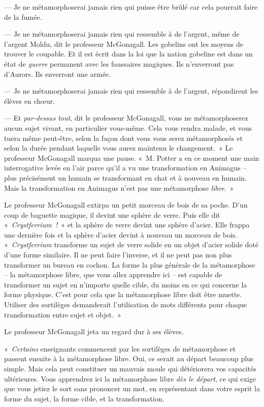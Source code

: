 --- Je ne métamorphoserai jamais rien qui puisse être brûlé car cela pourrait faire de la fumée.

--- Je ne métamorphoserai jamais rien qui ressemble à de l'argent, même de l'argent Moldu, dit le professeur McGonagall. Les gobelins ont les moyens de trouver le coupable. Et il est écrit dans la loi que la nation gobeline est dans un état de \emph{guerre} permanent avec les faussaires magiques. Ils n'enverront pas d'Aurors. Ils enverront une armée.

--- Je ne métamorphoserai jamais rien qui ressemble à de l'argent, répondirent les élèves en chœur.

--- Et \emph{par-dessus tout}, dit le professeur McGonagall, vous ne métamorphoserez aucun sujet vivant, en particulier vous-même. Cela vous rendra malade, et vous tuera même peut-être, selon la façon dont vous vous serez métamorphosés et selon la durée pendant laquelle vous aurez maintenu le changement.~» Le professeur McGonagall marqua une pause. «~M. Potter a en ce moment une main interrogative levée en l'air parce qu'il a vu une transformation en Animagus -- plus précisément un humain se transformant en chat et à nouveau en humain. Mais la transformation en Animagus n'est pas une métamorphose \emph{libre}.~»

Le professeur McGonagall extirpa un petit morceau de bois de sa poche. D'un coup de baguette magique, il devint une sphère de verre. Puis elle dit «~\emph{Crystferrium~!}~» et la sphère de verre devint une sphère d'acier. Elle frappa une dernière fois et la sphère d'acier devint à nouveau un morceau de bois. «~\emph{Crystferrium} transforme un sujet de verre solide en un objet d'acier solide doté d'une forme similaire. Il ne peut faire l'inverse, et il ne peut pas non plus transformer un bureau en cochon. La forme la plus générale de la métamorphose -- la métamorphose libre, que vous allez apprendre ici -- est capable de transformer un sujet en n'importe quelle cible, du moins en ce qui concerne la forme physique. C'est pour cela que la métamorphose libre doit être muette. Utiliser des sortilèges demanderait l'utilisation de mots différents pour chaque transformation entre sujet et objet.~»

Le professeur McGonagall jeta un regard dur à ses élèves.

«~\emph{Certains} enseignants commencent par les sortilèges de métamorphose et passent ensuite à la métamorphose libre. Oui, ce serait au départ beaucoup plus simple. Mais cela peut constituer un mauvais moule qui détériorera vos capacités ultérieures. Vous apprendrez ici la métamorphose libre \emph{dès le départ}, ce qui exige que vous jetiez le sort sans prononcer un mot, en représentant dans votre esprit la forme du sujet, la forme cible, et la transformation. %

